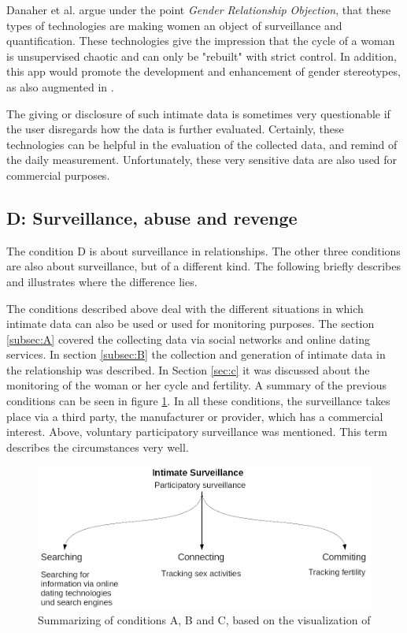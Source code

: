 Danaher et al. \cite{doi:10.1080/15265161.2017.1409823} argue under the point \textit{Gender Relationship Objection}, that these types of technologies are making women an object of surveillance and quantification. 
These technologies give the impression that the cycle of a woman is unsupervised chaotic and can only be "rebuilt" with strict control.
In addition, this app would promote the development and enhancement of gender stereotypes, as also augmented in \cite{doi:10.1080/13691058.2014.920528}.
 
The giving or disclosure of such intimate data is sometimes very questionable if the user disregards how the data is further evaluated. Certainly, these technologies can be helpful in the evaluation of the collected data, and remind of the daily measurement. Unfortunately, these very sensitive data are also used for commercial purposes.

\subsection{D: Surveillance, abuse and revenge}
The condition D is about surveillance in relationships.
The other three conditions are also about surveillance, but of a different kind. The following briefly describes and illustrates where the difference lies.

The conditions described above deal with the different situations in which intimate data can also be used or used for monitoring purposes.
The section \ref{subsec:A} covered the collecting data via social networks and online dating services. In section \ref{subsec:B} the collection and generation of intimate data in the relationship was described. In Section \ref{sec:c} it was discussed about the monitoring of the woman or her cycle and fertility.
A summary of the previous conditions can be seen in figure \ref{fig:intimate_surveillance}.
In all these conditions, the surveillance takes place via a third party, the manufacturer or provider, which has a commercial interest. Above, voluntary participatory surveillance was mentioned. This term describes the circumstances very well.
\begin{figure}[htb]
	\centering
	\includegraphics[width=\linewidth]{img/summary.png}
	\caption{Summarizing of conditions A, B and C, based on the visualization of \cite{ethicsOfSurveillance}}
	\label{fig:intimate_surveillance}
\end{figure}

